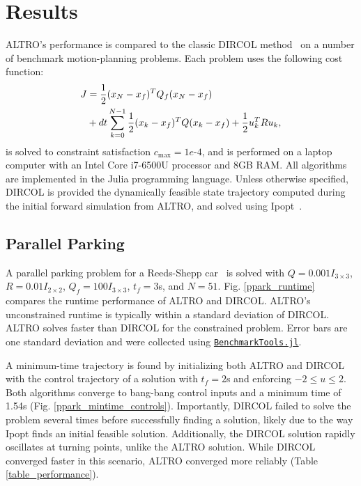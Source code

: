 \documentclass[../root.tex]{subfiles}
\begin{document}
\section{Results}
ALTRO's performance is compared to the classic DIRCOL
method~\cite{hargraves_Direct_1987} on a number of benchmark motion-planning problems.
Each problem uses the following cost function:
\begin{align}
    J &= \frac{1}{2}(x_N - x_f)^T Q_f(x_N - x_f) \\
    &+ dt\sum_{k=0}^{N-1} \frac{1}{2}(x_k- x_f)^T Q(x_k - x_f) + \frac{1}{2}u_k^T R u_k, \notag
\end{align}
is solved to constraint satisfaction $c_{\max} = 1e\text{-}4$, and is
performed on a laptop computer with an Intel Core i7-6500U processor and 8GB
RAM. All algorithms are implemented in the Julia programming language. Unless
otherwise specified, DIRCOL is provided the dynamically feasible state
trajectory computed during the initial forward simulation from ALTRO, and
solved using Ipopt~\cite{wachter_Implementation_2006}.


\subsection{Parallel Parking}
    A parallel parking problem for a Reeds-Shepp car~\cite{reeds_Optimal_1990} is
    solved with $Q = 0.001 I_{3 \times 3}$, $R = 0.01I_{2 \times 2} $, $Q_f =
    100I_{3 \times 3}$, $t_f = 3$s, and $N = 51$. Fig. \ref{ppark_runtime}
    compares the runtime performance of ALTRO and DIRCOL. ALTRO's
    unconstrained runtime is typically within a standard deviation of DIRCOL.
    ALTRO solves faster than DIRCOL for the constrained problem. Error bars
    are one standard deviation and were collected using
    \href{https://github.com/JuliaCI/BenchmarkTools.jl}{\texttt{BenchmarkTools.jl}}.
    
    A minimum-time trajectory is found by initializing both ALTRO and DIRCOL
    with the control trajectory of a solution with $t_f = 2$s and enforcing
    $-2 \leq u \leq 2$. Both algorithms converge to bang-bang control inputs
    and a minimum time of 1.54s (Fig. \ref{ppark_mintime_controls}).
    Importantly, DIRCOL failed to solve the problem several times before
    successfully finding a solution, likely due to the way Ipopt finds an
    initial feasible solution. Additionally, the DIRCOL solution rapidly
    oscillates at turning points, unlike the ALTRO solution. While DIRCOL
    converged faster in this scenario, ALTRO converged more reliably (Table
    \ref{table_performance}).
   
\end{document}
